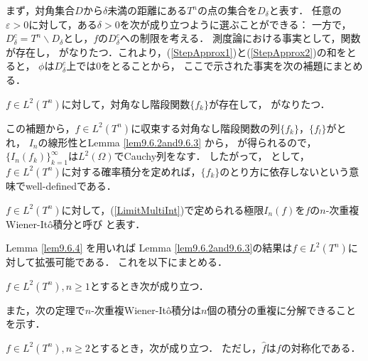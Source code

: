 まず，対角集合$D$から$\delta$未満の距離にある$T^n$の点の集合を$D_\delta$と表す．
任意の$\varepsilon>0$に対して，ある$\delta>0$を次が成り立つように選ぶことができる：
一方で，$D_\delta^c=T^n\backslash D_\delta$とし，$f$の$D_\delta^c$への制限を考える．
測度論における事実として，関数
が存在し，
がなりたつ．これより，(\ref{StepApprox1})と(\ref{StepApprox2})の和をとると，
$\phi$は$D_\delta^c$上では$0$をとることから，
ここで示された事実を次の補題にまとめる．
\begin{lemma}\label{lem9.6.4}%
$f\in L^2(T^n)$に対して，対角なし階段関数$\{f_k\}$が存在して，
がなりたつ．
\end{lemma}
この補題から，$f\in L^2(T^n)$に収束する対角なし階段関数の列$\{f_k\}$，$\{f_l\}$がとれ，
$I_n$の線形性とLemma \ref{lem9.6.2and9.6.3} から，
が得られるので，$\{I_n(f_k)\}_{k=1}^\infty$は$L^2(\Omega)$でCauchy列をなす．
したがって，
として，$f\in L^2(T^n)$に対する確率積分を定めれば，$\{f_k\}$のとり方に依存しないという意味でwell-definedである．
\begin{definition}\label{def9.6.5}
$f\in L^2(T^n)$に対して，(\ref{LimitMultiInt})で定められる極限$I_n(f)$を$f$の$n$-次重複Wiener-It\^o積分と呼び
と表す．
\end{definition}
Lemma \ref{lem9.6.4} を用いれば Lemma \ref{lem9.6.2and9.6.3}の結果は$f\in L^2(T^n)$に対して拡張可能である．
これを以下にまとめる．
\begin{theorem}\label{9.6.6}%
$f\in L^2(T^n),n\ge1$とするとき次が成り立つ．
\end{theorem}
また，次の定理で$n$-次重複Wiener-It\^o積分は$n$個の積分の重複に分解できることを示す．
\begin{theorem}\label{thm9.6.7}%
$f\in L^2(T^n), n\ge2$とするとき，次が成り立つ．
ただし，$\hat{f}$は$f$の対称化である．
\end{theorem}

